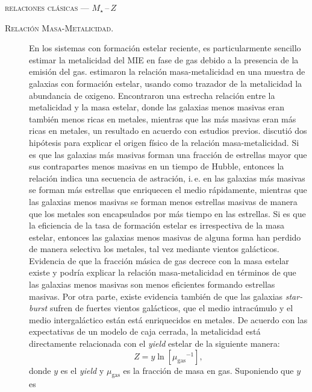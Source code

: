 \documentclass[xcolor=dvipsnames,4pt,hyperref={colorlinks,citecolor=black,linkcolor=black,urlcolor=black}]{beamer}
\begin{document}
\begin{frame}{\textsc{relaciones clásicas --- $M_\star\,$--$\,Z$}}

\begin{description}
\item[\textsc{Relación Masa-Metalicidad.}] En los sistemas con formación estelar reciente, es
particularmente sencillo estimar la metalicidad del MIE en fase de gas debido a la presencia de la
emisión del gas. \citet{Tremonti2004} estimaron la relación masa-metalicidad en una muestra de
galaxias con formación estelar, usando como trazador de la metalicidad la abundancia de oxigeno.
Encontraron una estrecha relación entre la metalicidad y la masa estelar, donde las galaxias menos
masivas eran también menos ricas en metales, mientras que las más masivas eran más ricas en metales,
un resultado en acuerdo con estudios previos.
\citeauthor{Tremonti2004} discutió dos hipótesis para explicar el origen físico de la relación
masa-metalicidad. Si es que las galaxias más masivas forman una fracción de estrellas mayor que sus
contrapartes menos masivas en un tiempo de Hubble, entonces la relación indica una secuencia de
astración, i.\,e. en las galaxias más masivas se forman más estrellas que enriquecen el medio
rápidamente, mientras que las galaxias menos masivas se forman menos estrellas masivas de manera que
los metales son encapsulados por más tiempo en las estrellas.
Si es que la eficiencia de la tasa de formación estelar es irrespectiva de la masa estelar, entonces
las galaxias menos masivas de alguna forma han perdido de manera selectiva los metales, tal vez
mediante vientos galácticos.
Evidencia de que la fracción másica de gas decrece con la masa estelar existe \citep{Bell2000} y
podría explicar la relación masa-metalicidad en términos de que las galaxias menos masivas son menos
eficientes formando estrellas masivas. Por otra parte, existe evidencia también de que las galaxias
\emph{star-burst} sufren de fuertes vientos galácticos, que el medio intracúmulo y el medio
intergaláctico están está enriquecidos en metales.
%
De acuerdo con las expectativas de un modelo de caja cerrada, la metalicidad está directamente
relacionada con el \emph{yield} estelar de la siguiente manera:
%
$$
Z = y\ln{\left[{\mu_\text{gas}}^{-1}\right]},
$$
%
donde $y$ es el \emph{yield} y $\mu_\text{gas}$ es la fracción de masa en gas. Suponiendo que $y$ es

\end{description}
\end{frame}
\end{document}
